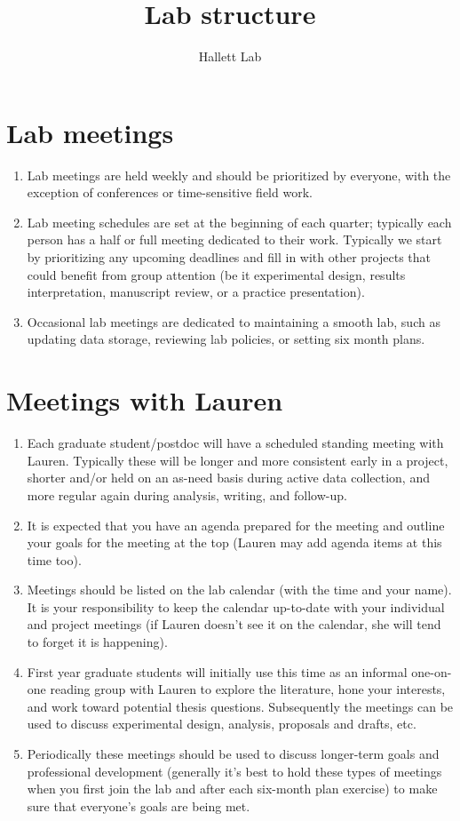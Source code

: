 \documentclass[12pt]{article}
\title{Lab structure}
\author{Hallett Lab}
\begin{document}
\maketitle

\section{Lab meetings}
\begin{enumerate}
\item Lab meetings are held weekly and should be prioritized by everyone, with the exception of conferences or time-sensitive field work.
\item Lab meeting schedules are set at the beginning of each quarter; typically each person has a half or full meeting dedicated to their work. Typically we start by prioritizing any upcoming deadlines and fill in with other projects that could benefit from group attention (be it experimental design, results interpretation, manuscript review, or a practice presentation). 
\item Occasional lab meetings are dedicated to maintaining a smooth lab, such as updating data storage, reviewing lab policies, or setting six month plans. 
\end{enumerate}

\section{Meetings with Lauren}
\begin{enumerate}
\item Each graduate student/postdoc will have a scheduled standing meeting with Lauren. Typically these will be longer and more consistent early in a project, shorter and/or held on an as-need basis during active data collection, and more regular again during analysis, writing, and follow-up.
\item It is expected that you have an agenda prepared for the meeting and outline your goals for the meeting at the top (Lauren may add agenda items at this time too). 
\item Meetings should be listed on the lab calendar (with the time and your name). It is your responsibility to keep the calendar up-to-date with your individual and project meetings (if Lauren doesn't see it on the calendar, she will tend to forget it is happening).
\item First year graduate students will initially use this time as an informal one-on-one reading group with Lauren to explore the literature, hone your interests, and work toward potential thesis questions. Subsequently the meetings can be used to discuss experimental design, analysis, proposals and drafts, etc. 
\item Periodically these meetings should be used to discuss longer-term goals and professional development (generally it's best to hold these types of meetings when you first join the lab and after each six-month plan exercise) to make sure that everyone's goals are being met.
  \end{enumerate}
\end{document}
